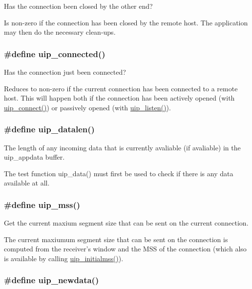 Has the connection been closed by the other end? 

Is non-zero if the connection has been closed by the remote host. The application may then do the necessary clean-ups. \hypertarget{a00064_gdb971fb1525d0c5002f52125b05f3218}{
\subsubsection[uip\_\-connected]{\setlength{\rightskip}{0pt plus 5cm}\#define uip\_\-connected()}}
\label{a00064_gdb971fb1525d0c5002f52125b05f3218}


Has the connection just been connected? 

Reduces to non-zero if the current connection has been connected to a remote host. This will happen both if the connection has been actively opened (with \hyperlink{a00064_gce715881b240922bba96613c2a88fd67}{uip\_\-connect()}) or passively opened (with \hyperlink{a00064_gdd1ab3704ecd4900eec61a6897d32dc8}{uip\_\-listen()}). \hypertarget{a00064_g1a1bc437c09ddef238abab41d77c3177}{
\subsubsection[uip\_\-datalen]{\setlength{\rightskip}{0pt plus 5cm}\#define uip\_\-datalen()}}
\label{a00064_g1a1bc437c09ddef238abab41d77c3177}


The length of any incoming data that is currently avaliable (if avaliable) in the uip\_\-appdata buffer. 

The test function uip\_\-data() must first be used to check if there is any data available at all. \hypertarget{a00064_gb5fecbc62edd128012cea0f47b57ab9f}{
\subsubsection[uip\_\-mss]{\setlength{\rightskip}{0pt plus 5cm}\#define uip\_\-mss()}}
\label{a00064_gb5fecbc62edd128012cea0f47b57ab9f}


Get the current maxium segment size that can be sent on the current connection. 

The current maxiumum segment size that can be sent on the connection is computed from the receiver's window and the MSS of the connection (which also is available by calling \hyperlink{a00064_ga87feebc7cffd4d8300e776cf64e4fec}{uip\_\-initialmss()}). \hypertarget{a00064_g26a14b8dae3f861830af9e7cf1e03725}{
\subsubsection[uip\_\-newdata]{\setlength{\rightskip}{0pt plus 5cm}\#define uip\_\-newdata()}}
\label{a00064_g26a14b8dae3f861830af9e7cf1e03725}


